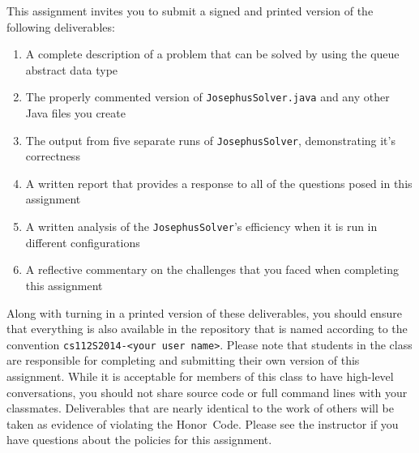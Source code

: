   This assignment invites you to submit a signed and printed version of the following deliverables: 

  \begin{enumerate} 
  \itemsep0pt

  \item A complete description of a problem that can be solved by using the queue abstract data type

  \item The properly commented version of {\tt JosephusSolver.java} and any other Java files you create

  \item The output from five separate runs of {\tt JosephusSolver}, demonstrating it's correctness 

  \item A written report that provides a response to all of the questions posed in this assignment

  \item A written analysis of the {\tt JosephusSolver}'s efficiency when it is run in different configurations 

  \item A reflective commentary on the challenges that you faced when completing this assignment 
   
  \end{enumerate}

  Along with turning in a printed version of these deliverables, you should ensure that everything is also available in
  the repository that is named according to the convention {\tt cs112S2014-<your user name>}. Please note that students
  in the class are responsible for completing and submitting their own version of this assignment.    While it is
  acceptable for members of this class to have high-level conversations, you should not share source code or full
  command lines with your classmates.  Deliverables that are nearly identical to the work of others will be taken as
  evidence of violating the \mbox{Honor Code}.  Please see the instructor if you have questions about the policies for
  this assignment.

  

